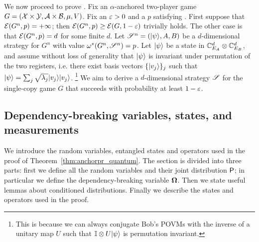 
We now proceed to prove . Fix an $\alpha$-anchored two-player game $G = (\X \times \Y,\A \times \B,\mu,V)$. Fix an $\eps > 0$ and a $p$ satisfying . First suppose that $\E(G^n,p) = +\infty$; then $\E(G^n,p) \geq \E(G,1 - \eps)$ trivially holds. The other case is that $\E(G^n,p) = d$ for some finite $d$. Let $\strategy^n = (\ket{\psi},A,B)$ be a $d$-dimensional strategy for $G^n$ with value $\eval(G^n,\strategy^n) = p$. Let $\ket{\psi}$ be a state in $\C_{E_A}^d \otimes \C_{E_B}^d$, and assume without loss of generality that $\ket{\psi}$ is invariant under permutation of the two registers, i.e. there exist basis vectors $\{ \ket{v_j} \}_j$ such that $\ket{\psi} = \sum_j \sqrt{\lambda_j} \ket{v_j} \ket{v_j}$. \footnote{This is because we can always conjugate Bob's POVMs with the inverse of a unitary map $U$ such that $\Id \otimes U \ket{\psi}$ is permutation invariant.} We aim to derive a $d$-dimensional strategy $\strategy$ for the single-copy game $G$ that succeeds with probability at least $1 - \eps$. 





\subsection{Dependency-breaking variables, states, and measurements}
\label{sec:quantum_setup}

We introduce the random variables, entangled states and operators used in the proof of Theorem~\ref{thm:anchorpr_quantum}. The section is divided into three parts: first we define all the random variables and their joint distribution $\P$; in particular we define the dependency-breaking variable $\bOmega$. Then we state useful lemmas about conditioned distributions. Finally we describe the states and operators used in the proof.

